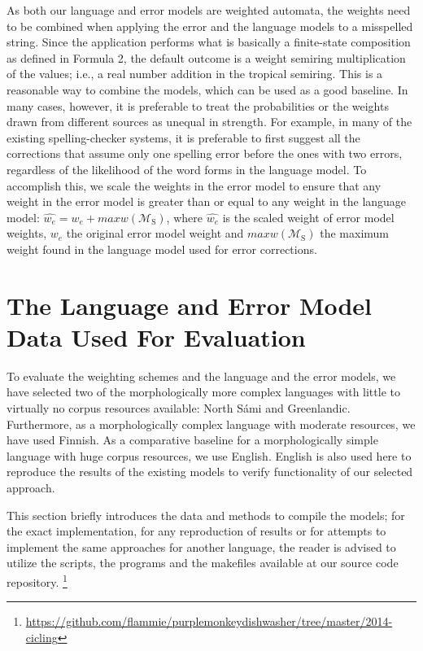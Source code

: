 \documentclass[postprint]{flammie}
\begin{document}
As both our language and error models are weighted automata, the weights need
to be combined when applying the error and the language models to a misspelled
string.  Since the application performs what is basically a finite-state
composition as defined in Formula 2, the default outcome is a weight semiring
multiplication of the values; i.e., a real number addition in the tropical
semiring. This is a reasonable way to combine the models, which can be used
as a good baseline. In many cases, however, it is preferable to treat the
probabilities or the weights drawn from different sources as unequal in
strength. For example, in many of the existing spelling-checker systems, it is
preferable to first suggest all the corrections that assume only one spelling
error before the ones with two errors, regardless of the likelihood of the word
forms in the language model. To accomplish this, we scale the weights in the
error model to ensure that any weight in the error model is greater than or
equal to any weight in the language model: $\hat{w_e} =
w_e + maxw(\mathcal{M}_\mathrm{S})$, where $\hat{w_e}$ is the scaled
weight of error model weights, $w_e$ the original error model weight and 
$maxw(\mathcal{M}_\mathrm{S})$ the
maximum weight found in the language model used for error corrections.

\section{The Language and Error Model Data Used For Evaluation}

To evaluate the weighting schemes and the language and the error models, we
have selected two of the morphologically more complex languages with little to
virtually no corpus resources available: North Sámi and Greenlandic.
Furthermore, as a morphologically complex language with moderate resources,
we have used Finnish. As a comparative baseline for a morphologically simple
language with huge corpus resources, we use English. English is also used
here to reproduce the results of the existing models to verify functionality
of our selected approach.

This section briefly introduces the data and methods to compile the models; for
the exact implementation, for any reproduction of results or for attempts to
implement the same approaches for another language, the reader is advised to
utilize the scripts, the programs and the makefiles available at our source
code repository.
\footnote{\url{https://github.com/flammie/purplemonkeydishwasher/tree/master/2014-cicling}}
\end{document}
